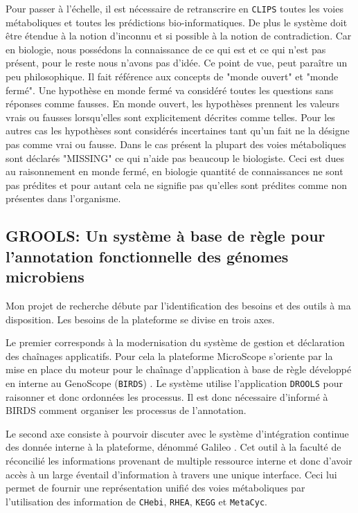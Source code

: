 \begin{refsegment}
Pour passer à l'échelle, il est nécessaire de retranscrire  en \texttt{\gls{CLIPS}}  toutes les voies métaboliques et toutes les prédictions bio-informatiques. De plus le système doit être étendue à la notion d'inconnu et si possible à la notion de contradiction. Car en biologie, nous possédons la connaissance de ce qui est et ce qui n'est pas présent, pour le reste nous n'avons pas d'idée. Ce point de vue, peut paraître un peu philosophique. Il fait référence aux concepts de "monde ouvert" et "monde fermé". Une hypothèse en monde fermé va considéré toutes les questions sans réponses comme fausses. En monde ouvert, les hypothèses prennent les valeurs vrais ou fausses lorsqu'elles sont explicitement décrites comme telles. Pour les autres cas les hypothèses sont considérés incertaines tant qu'un fait ne la désigne pas comme vrai ou fausse. Dans le cas présent la plupart des voies métaboliques sont déclarés "MISSING" ce qui n'aide pas beaucoup le biologiste. Ceci est dues au raisonnement en monde fermé, en biologie quantité de connaissances ne sont pas prédites et pour autant cela ne signifie pas qu'elles sont prédites comme non présentes dans l'organisme.

\subsection{GROOLS: Un système à base de règle pour l'annotation fonctionnelle des génomes microbiens}

Mon projet de recherche débute par l'identification des besoins et des outils à ma disposition. Les besoins de la plateforme se divise en trois axes.

Le premier  corresponds à la modernisation du système de gestion et déclaration des chaînages applicatifs. Pour cela la plateforme MicroScope s'oriente par la mise en place du moteur pour le chaînage d'application à base de règle développé en interne au GenoScope (\texttt{\gls{BIRDS}}) . Le système utilise l'application \texttt{DROOLS}\cite{browne2009jboss} pour raisonner et donc ordonnées les processus. Il est donc nécessaire d'informé à \gls{BIRDS} comment organiser les processus de l'annotation.

Le second axe consiste à pourvoir discuter avec le  système d'intégration continue des donnée interne à la plateforme, dénommé Galileo \cite{galileo2014}. Cet outil à la faculté de réconcilié les informations provenant de multiple ressource interne et donc d'avoir accès à un large éventail d'information à travers une unique interface. Ceci lui permet de fournir une représentation unifié des voies métaboliques par l'utilisation des information de \texttt{CHebi}, \texttt{RHEA}, \texttt{KEGG} et \texttt{MetaCyc}.


\end{refsegment}
